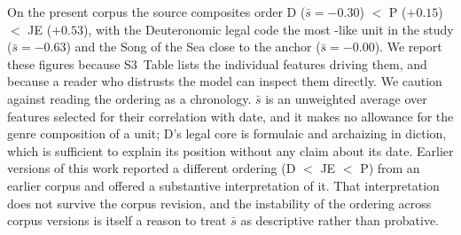 On the present corpus the source composites order
D ($\bar{s} = -0.30$) $<$ P ($+0.15$) $<$ JE ($+0.53$), with the
Deuteronomic legal code the most \cbh{}-like unit in the study
($\bar{s} = -0.63$) and the Song of the Sea close to the \cbh{} anchor
($\bar{s} = -0.00$).  We report these figures because S3~Table lists the
individual features driving them, and because a reader who distrusts the
model can inspect them directly.  We caution against reading the ordering
as a chronology.  $\bar{s}$ is an unweighted average over features selected
for their correlation with date, and it makes no allowance for the genre
composition of a unit; D's legal core is formulaic and archaizing in
diction, which is sufficient to explain its position without any claim
about its date.  Earlier versions of this work reported a different
ordering (D $<$ JE $<$ P) from an earlier corpus and offered a
substantive interpretation of it.  That interpretation does not survive
the corpus revision, and the instability of the ordering across corpus
versions is itself a reason to treat $\bar{s}$ as descriptive rather than
probative.
